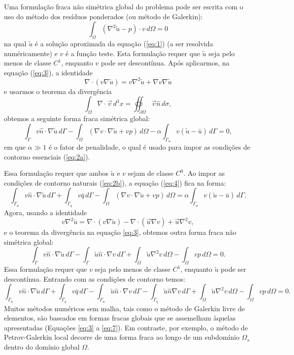 \documentclass[10pt,a4paper]{article}
\newcommand{\prt}[1]{\left(#1\right)}
\begin{document}
	Uma formulação fraca não simétrica global do problema pode ser escrita com o uso do método dos resíduos ponderados (ou método de Galerkin):
	\begin{equation}
		\int_\Omega \prt{\nabla^2\tilde{u} - p}\cdot v\,d\Omega = 0
		\label{eq:3}
	\end{equation}
	na qual $\tilde{u}$ é a solução aproximada da equação (\ref{eq:1}) (a ser resolvida numéricamente) e $v$ é a função teste. Esta formulação requer que $\tilde{u}$ seja pelo menos de classe $C^1$, enquanto $v$ pode ser descontínua. Após aplicarmos, na equação (\ref{eq:3}), a identidade \[\nabla\cdot\prt{v\nabla\tilde{u}} = v\nabla^2\tilde{u} + \nabla v\nabla\tilde{u}\] e usarmos o teorema da divergência \[\int_\Omega\nabla\cdot\vec{v}\,d^3x = \oiint_{\partial\Omega}\vec{v}\hat{n}\,d\sigma,\] obtemos a seguinte forma fraca simétrica global:
	\begin{equation}
		\int_\Gamma v\hat{n}\cdot\nabla\tilde{u}\,d\Gamma - \int_\Omega\prt{\nabla v\cdot\nabla\tilde{u}+vp}\,d\Omega - \alpha\int_{\Gamma_u} v\prt{\tilde{u}-\bar{u}}\,d\Gamma = 0,
		\label{eq:4}
	\end{equation}
	em que $\alpha\gg 1$ é o fator de penalidade, o qual é usado para impor as condições de contorno essenciais (\ref{eq:2a}).

	Essa formulação requer que ambos $\tilde{u}$ e $v$ sejam de classe $C^0$. Ao impor as condições de contorno naturais (\ref{eq:2b}), a equação (\ref{eq:4}) fica na forma:
	\begin{equation}
		\int_{\Gamma_u} v\hat{n}\cdot\nabla\tilde{u}\,d\Gamma +\int_{\Gamma_q} v\bar{q}\,d\Gamma - \int_\Omega\prt{\nabla v\cdot\nabla\tilde{u}+vp}\,d\Omega = \alpha\int_{\Gamma_u} v\prt{\tilde{u}-\bar{u}}\,d\Gamma.
		\label{eq:5}
	\end{equation}
	Agora, usando a identidade \[v\nabla^2\tilde{u} = \nabla\cdot(v\nabla\tilde{u}) - \nabla\cdot(\vec{u}\nabla v) + \vec{u}\nabla^2v,\] e o teorema da divergência na equação {\ref{eq:3}}, obtemos outra forma fraca não simétrica global:
	\begin{equation}
		\int_{\Gamma} v\hat{n}\cdot\nabla\tilde{u}\,d\Gamma - \int_{\Gamma} \tilde{u}\hat{n}\cdot\nabla v\,d\Gamma + \int_\Omega \tilde{u}\nabla^2v\,d\Omega - \int_\Omega vp\,d\Omega = 0.
		\label{eq:6}
	\end{equation}
	Essa formulação requer que $v$ seja pelo menos de classe $C^1$, enquanto $\tilde{u}$ pode ser descontínua. Entrando com as condições de contorno temos:
	\begin{equation}
		\int_{\Gamma_u} v\hat{n}\cdot\nabla\tilde{u}\,d\Gamma + \int_{\Gamma_q}v\bar{q}\,d\Gamma - \int_{\Gamma_u} \tilde{u}\hat{n}\cdot\nabla v\,d\Gamma - \int_{\Gamma_q} \tilde{u}\hat{n}\nabla v\,d\Gamma + \int_\Omega \tilde{u}\nabla^2v\,d\Omega - \int_\Omega vp\,d\Omega = 0.
		\label{eq:7}
	\end{equation}
	Muitos métodos numéricos sem malha, tais como o método de Galerkin livre de elementos, são baseados em formas fracas globais que se assemelham àquelas apresentadas (Equações \ref{eq:3} a \ref{eq:7}). Em contraste, por exemplo, o método de Petrov-Galerkin local decorre de uma forma fraca ao longo de um subdomínio $\Omega_s$ dentro do domínio global $\Omega$.
\end{document}
